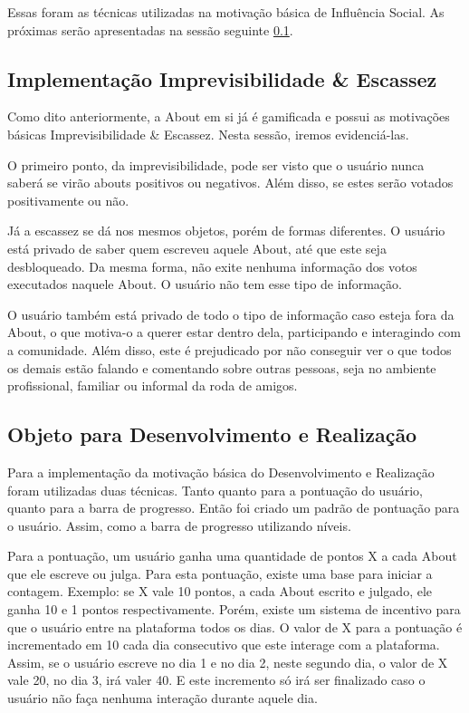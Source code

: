 Essas foram as técnicas utilizadas na motivação básica de Influência Social. As próximas
serão apresentadas na sessão seguinte \ref{sub:implementacao_imprevisibilidade}.

\subsection{Implementação Imprevisibilidade \& Escassez}
\label{sub:implementacao_imprevisibilidade}

Como dito anteriormente, a About em si já é gamificada e possui as motivações básicas Imprevisibilidade \&
Escassez. 
Nesta sessão, iremos evidenciá-las. 

O primeiro ponto, da imprevisibilidade, pode ser visto que o usuário nunca saberá se virão
abouts positivos ou negativos. Além disso, se estes serão votados positivamente ou não. 

Já a escassez se dá nos mesmos objetos, porém de formas diferentes. O usuário está privado
de saber quem escreveu aquele About, até que este seja desbloqueado. Da mesma forma, não exite
nenhuma informação dos votos executados naquele About. O usuário não tem esse tipo de informação.

O usuário também está privado de todo o tipo de informação caso esteja fora da About, o que motiva-o
a querer estar dentro dela, participando e interagindo com a comunidade. Além disso, este é prejudicado
por não  conseguir ver o que todos os demais estão falando e comentando sobre outras pessoas, seja no
ambiente profissional, familiar ou informal da roda de amigos.

\subsection{Objeto para Desenvolvimento e Realização}
\label{sub:objeto_desenvolvimento_e_realizacao}
Para a implementação da motivação básica do Desenvolvimento e Realização foram utilizadas duas técnicas.
Tanto quanto para a pontuação do usuário, quanto para a barra de progresso. Então foi criado um padrão de pontuação para
o usuário. Assim, como a barra de progresso utilizando níveis.

Para a pontuação, um usuário ganha uma quantidade de pontos X a cada About que ele escreve ou julga.
Para esta pontuação, existe uma base para iniciar a contagem. Exemplo: se X vale 10 pontos, a cada About escrito e
julgado, ele ganha 10 e 1 pontos respectivamente. 
Porém, existe um sistema de incentivo para que o usuário entre na plataforma todos os dias. O valor de X para a pontuação
é incrementado em 10 cada dia consecutivo que este interage com a plataforma. Assim, se o usuário escreve no dia 1 e no dia 2,
neste segundo dia, o valor de X vale 20, no dia 3, irá valer 40. E este incremento só irá ser finalizado
caso o usuário não faça nenhuma interação durante aquele dia.

